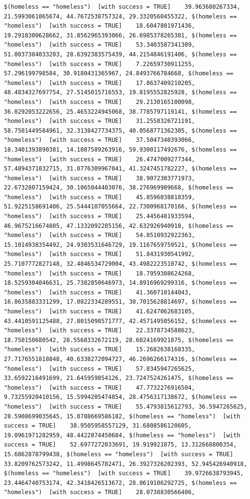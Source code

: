 \documentclass{tufte-book}\usepackage[]{graphicx}\usepackage[]{xcolor}
\makeatletter
\newenvironment{kframe}{%
 \def\at@end@of@kframe{}%
 \ifinner\ifhmode%
  \def\at@end@of@kframe{\end{minipage}}%
  \begin{minipage}{\columnwidth}%
 \fi\fi%
 \def\FrameCommand##1{\hskip\@totalleftmargin \hskip-\fboxsep
 \colorbox{shadecolor}{##1}\hskip-\fboxsep
     \hskip-\linewidth \hskip-\@totalleftmargin \hskip\columnwidth}%
 \MakeFramed {\advance\hsize-\width
   \@totalleftmargin\z@ \linewidth\hsize
   \@setminipage}}%
 {\par\unskip\endMakeFramed%
 \at@end@of@kframe}
\newenvironment{knitrout}{}{} %
\makeatother
\begin{document}
\begin{knitrout}
\begin{kframe}
\begin{verbatim}
$(homeless == "homeless")  [with success = TRUE]    39.963680267334, 21.5993061065674, 44.7672538757324, 29.3320560455322, $(homeless == "homeless")  [with success = TRUE]    18.6047801971436, 19.2918300628662, 31.8562965393066, 26.6985378265381, $(homeless == "homeless")  [with success = TRUE]    53.3403587341309, 51.0037384033203, 28.6392383575439, 44.2154846191406, $(homeless == "homeless")  [with success = TRUE]    7.22659730911255, 57.296199798584, 30.9180431365967, 24.8493766784668, $(homeless == "homeless")  [with success = TRUE]    17.8637409210205, 48.4834327697754, 27.5145015716553, 19.8195552825928, $(homeless == "homeless")  [with success = TRUE]    29.2130165100098, 36.0292053222656, 25.4653224945068, 38.7785797119141, $(homeless == "homeless")  [with success = TRUE]    31.2558326721191, 58.7501449584961, 32.3138427734375, 40.0568771362305, $(homeless == "homeless")  [with success = TRUE]    37.5047340393066, 18.3401393890381, 14.1087589263916, 59.9300117492676, $(homeless == "homeless")  [with success = TRUE]    26.4747009277344, 57.4894371032715, 31.0776309967041, 41.3247451782227, $(homeless == "homeless")  [with success = TRUE]    38.9072303771973, 22.6732807159424, 30.1065044403076, 38.276969909668, $(homeless == "homeless")  [with success = TRUE]    45.8596038818359, 51.9225158691406, 25.5444107055664, 22.7300968170166, $(homeless == "homeless")  [with success = TRUE]    25.4456481933594, 46.9675216674805, 47.1332092285156, 42.632926940918, $(homeless == "homeless")  [with success = TRUE]    54.8510932922363, 15.1014938354492, 24.9303531646729, 19.1167659759521, $(homeless == "homeless")  [with success = TRUE]    51.8431930541992, 25.7107772827148, 32.4846534729004, 43.4982223510742, $(homeless == "homeless")  [with success = TRUE]    18.7959308624268, 18.5259304046631, 25.7382850646973, 14.8916969299316, $(homeless == "homeless")  [with success = TRUE]    41.360710144043, 16.8635883331299, 17.0822334289551, 30.7015628814697, $(homeless == "homeless")  [with success = TRUE]    41.6247062683105, 43.4410591125488, 27.8015098571777, 42.4571495056152, $(homeless == "homeless")  [with success = TRUE]    22.3378734588623, 18.750150680542, 28.5568332672119, 28.6024169921875, $(homeless == "homeless")  [with success = TRUE]    15.2682638168335, 27.7176551818848, 40.6338272094727, 46.2696266174316, $(homeless == "homeless")  [with success = TRUE]    57.8345947265625, 33.6592216491699, 21.645959854126, 23.7247524261475, $(homeless == "homeless")  [with success = TRUE]    47.7732276916504, 9.73255920410156, 15.5994205474854, 28.4756317138672, $(homeless == "homeless")  [with success = TRUE]    55.4793815612793, 36.5947265625, 28.5908699035645, 15.0788669586182, $(homeless == "homeless")  [with success = TRUE]    38.9505958557129, 31.6808586120605, 19.0961971282959, 48.4422874450684, $(homeless == "homeless")  [with success = TRUE]    52.6977272033691, 19.919921875, 13.312668800354, 15.6862878799438, $(homeless == "homeless")  [with success = TRUE]    33.8209762573242, 11.4998645782471, 26.3927326202393, 52.945426940918, $(homeless == "homeless")  [with success = TRUE]    39.9726638793945, 23.4464740753174, 42.3418426513672, 28.0619106292725, $(homeless == "homeless")  [with success = TRUE]    28.0738830566406, 
\end{verbatim}
\end{kframe}
\end{knitrout}
\end{document}
